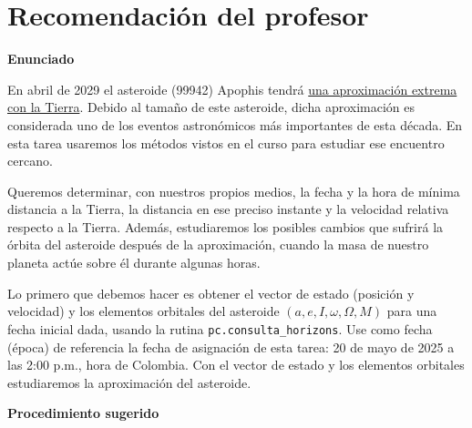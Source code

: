 \documentclass[a4paper]{article}
\begin{document}
\section{Recomendación del profesor}

\textbf{Enunciado}

En abril de 2029 el asteroide (99942) Apophis tendrá \href{https://arxiv.org/pdf/2201.12205}{una aproximación extrema con la Tierra}. Debido al tamaño de este asteroide, dicha aproximación es considerada uno de los eventos astronómicos más importantes de esta década. En esta tarea usaremos los métodos vistos en el curso para estudiar ese encuentro cercano.

Queremos determinar, con nuestros propios medios, la fecha y la hora de mínima distancia a la Tierra, la distancia en ese preciso instante y la velocidad relativa respecto a la Tierra. Además, estudiaremos los posibles cambios que sufrirá la órbita del asteroide después de la aproximación, cuando la masa de nuestro planeta actúe sobre él durante algunas horas.

Lo primero que debemos hacer es obtener el vector de estado (posición y velocidad) y los elementos orbitales del asteroide $\left(a,e,I,\omega,\Omega,M\right)$ para una fecha inicial dada, usando la rutina \texttt{pc.consulta\_horizons}. Use como fecha (época) de referencia la fecha de asignación de esta tarea: 20 de mayo de 2025 a las 2:00 p.m., hora de Colombia. Con el vector de estado y los elementos orbitales estudiaremos la aproximación del asteroide.

\textbf{Procedimiento sugerido}
\end{document}
